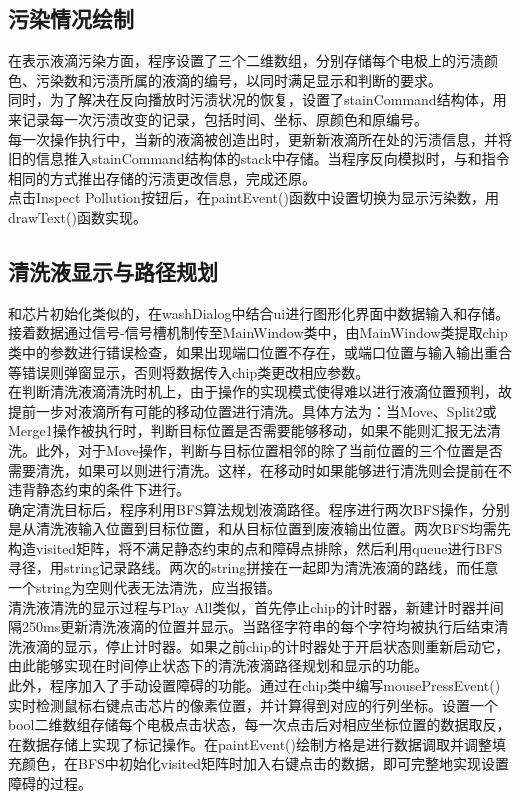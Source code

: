 \documentclass[12pt, a4paper]{article}
\begin{document}
		\subsection{污染情况绘制}
			在表示液滴污染方面，程序设置了三个二维数组，分别存储每个电极上的污渍颜色、污染数和污渍所属的液滴的编号，以同时满足显示和判断的要求。 \\ \hspace*{0.8cm}
			同时，为了解决在反向播放时污渍状况的恢复，设置了stainCommand结构体，用来记录每一次污渍改变的记录，包括时间、坐标、原颜色和原编号。 \\ \hspace*{0.8cm}
			每一次操作执行中，当新的液滴被创造出时，更新新液滴所在处的污渍信息，并将旧的信息推入stainCommand结构体的stack中存储。当程序反向模拟时，与和指令相同的方式推出存储的污渍更改信息，完成还原。  \\ \hspace*{0.8cm} 
			点击Inspect Pollution按钮后，在paintEvent()函数中设置切换为显示污染数，用drawText()函数实现。
		\subsection{清洗液显示与路径规划}
			和芯片初始化类似的，在washDialog中结合ui进行图形化界面中数据输入和存储。接着数据通过信号-信号槽机制传至MainWindow类中，由MainWindow类提取chip类中的参数进行错误检查，如果出现端口位置不存在，或端口位置与输入输出重合等错误则弹窗显示，否则将数据传入chip类更改相应参数。\\ \hspace*{0.8cm}
			在判断清洗液滴清洗时机上，由于操作的实现模式使得难以进行液滴位置预判，故提前一步对液滴所有可能的移动位置进行清洗。具体方法为：当Move、Split2或Merge1操作被执行时，判断目标位置是否需要能够移动，如果不能则汇报无法清洗。此外，对于Move操作，判断与目标位置相邻的除了当前位置的三个位置是否需要清洗，如果可以则进行清洗。这样，在移动时如果能够进行清洗则会提前在不违背静态约束的条件下进行。 \\ \hspace*{0.8cm}
			确定清洗目标后，程序利用BFS算法规划液滴路径。程序进行两次BFS操作，分别是从清洗液输入位置到目标位置，和从目标位置到废液输出位置。两次BFS均需先构造visited矩阵，将不满足静态约束的点和障碍点排除，然后利用queue进行BFS寻径，用string记录路线。两次的string拼接在一起即为清洗液滴的路线，而任意一个string为空则代表无法清洗，应当报错。\\ \hspace*{0.8cm}
			清洗液清洗的显示过程与Play All类似，首先停止chip的计时器，新建计时器并间隔250ms更新清洗液滴的位置并显示。当路径字符串的每个字符均被执行后结束清洗液滴的显示，停止计时器。如果之前chip的计时器处于开启状态则重新启动它，由此能够实现在时间停止状态下的清洗液滴路径规划和显示的功能。 \\ \hspace*{0.8cm}
			此外，程序加入了手动设置障碍的功能。通过在chip类中编写mousePressEvent()实时检测鼠标右键点击芯片的像素位置，并计算得到对应的行列坐标。设置一个bool二维数组存储每个电极点击状态，每一次点击后对相应坐标位置的数据取反，在数据存储上实现了标记操作。在paintEvent()绘制方格是进行数据调取并调整填充颜色，在BFS中初始化visited矩阵时加入右键点击的数据，即可完整地实现设置障碍的过程。
\end{document}

